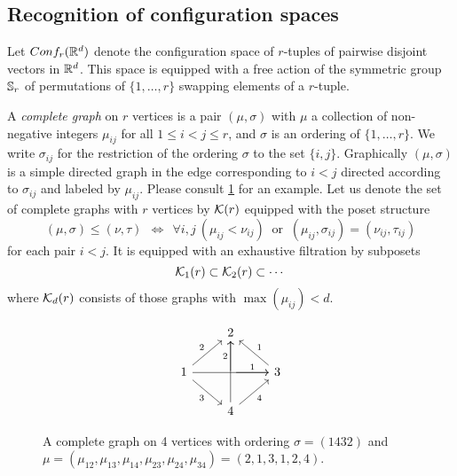 
\subsection{Recognition of configuration spaces}\label{ss:recognition}

Let $Conf_{r}(\mathbb{R}^{d})$ denote the configuration space of $r$-tuples of pairwise disjoint vectors in $\mathbb{R}^{d}$.
This space is equipped with a free action of the symmetric group $\mathbb{S}_r$ of permutations of $\{1,\dots,r\}$ swapping elements of a $r$-tuple.

\begin{definition}
	A \textit{complete graph} on $r$ vertices is a pair $(\mu,\sigma)$ with $\mu$ a collection of non-negative integers $\mu_{ij}$ for all $1 \leq i < j \leq r$, and $\sigma$ is an ordering of $\{1,\dots,r\}$.
	We write $\sigma_{ij}$ for the restriction of the ordering $\sigma$ to the set $\{i,j\}$.
	Graphically $(\mu,\sigma)$ is a simple directed graph in the edge corresponding to $i<j$ directed according to $\sigma_{ij}$ and labeled by $\mu_{ij}$.
	Please consult \cref{f:complete graph} for an example.
	Let us denote the set of complete graphs with $r$ vertices by $\mathcal{K}(r)$ equipped with the poset structure
	\begin{equation*}
		(\mu,\sigma)\le (\nu,\tau) \ \ \iff \ \
		\forall i,j \ (\mu_{ij}<\nu_{ij}) \ \text{ or } \
		(\mu_{ij},\sigma_{ij})= (\nu_{ij},\tau_{ij})
	\end{equation*}
	for each pair $i<j$.
	It is equipped with an exhaustive filtration by subposets
	\[
	\mathcal{K}_1(r) \subset \mathcal{K}_2(r) \subset \dotsb
	\]
	where $\mathcal{K}_d(r)$ consists of those graphs with $\max(\mu_{ij}) < d$.
\end{definition}

\begin{figure}
	\centering
	\begin{equation*}
		\begin{tikzcd}
			\ & 2 & \ \\
			1 \arrow[ur,"2"] \arrow[rr] \arrow[dr,"3"']& \arrow[r,"1"] \arrow[u,"2"] & 3 \arrow[ul,"1"'] \\
			\ & 4 \arrow[ur,"4"'] \arrow[uu] & \
		\end{tikzcd}
	\end{equation*}
	\caption{A complete graph on 4 vertices with ordering $\sigma=(1432)$ and $\mu=(\mu_{12},\mu_{13},\mu_{14},\mu_{23},\mu_{24},\mu_{34})=(2,1,3,1,2,4)$.}
	\label{f:complete graph}
\end{figure}


